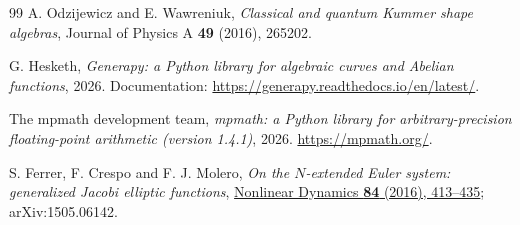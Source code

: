 \documentclass[11pt]{article}
\begin{document}
\begin{thebibliography}{99}
A. Odzijewicz and E. Wawreniuk, \emph{Classical and quantum Kummer shape algebras}, Journal of Physics A \textbf{49} (2016), 265202.

G. Hesketh, \emph{Generapy: a Python library for algebraic curves and Abelian functions}, 2026. Documentation: \url{https://generapy.readthedocs.io/en/latest/}.

The mpmath development team, \emph{mpmath: a Python library for arbitrary-precision floating-point arithmetic (version 1.4.1)}, 2026. \url{https://mpmath.org/}.

S. Ferrer, F. Crespo and F. J. Molero, \emph{On the $N$-extended Euler system: generalized Jacobi elliptic functions}, \href{https://doi.org/10.1007/s11071-016-2633-4}{Nonlinear Dynamics \textbf{84} (2016), 413--435}; arXiv:1505.06142.

\end{thebibliography}
\end{document}
